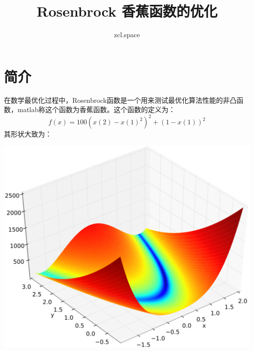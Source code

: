 \documentclass[10pt,a4paper,UTF8]{article}
\author{zcl.space}
\date{}
\title{Rosenbrock 香蕉函数的优化}
\begin{document}
\maketitle
\tableofcontents
{}
\section{简介}
\label{sec:org3883a8c}


在数学最优化过程中，Rosenbrock函数是一个用来测试最优化算法性能的非凸函数，matlab称这个函数为香蕉函数。这个函数的定义为：
\begin{equation}
\label{eq:1}
f(x) = 100 (x(2) - x(1)^{2})^{2} + (1-x(1))^{2}
\end{equation}
其形状大致为：


\begin{center}
\includegraphics[width=.9\linewidth]{../../img/communication_matlab/20171014rosenbrock.png}
\end{center}
\end{document}
